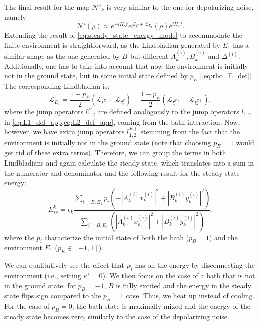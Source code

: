 The final result for the map $\mathcal{N}'_k$ is very similar to the one for depolarizing noise, namely
\begin{equation}
    \mathcal{N}'(\rho)\approx e^{-iH_{S}t}e^{\mathcal{L}_C+\mathcal{L}_{E_1}}(\rho) e^{i H_{S}t}.
\end{equation}
Extending the result of \cref{eq:steady_state_energy_mode} to accommodate the finite environment is straightforward, as the Lindbladian generated by $E_1$ has a similar shape as the one generated by $B$ but different $A_k^{(i)},B_k^{(i)}$ and $\Delta^{(i)}$. Additionally, one has to take into account that now the environment is initially not in the ground state, but in some initial state defined by $p_E$ [\cref{eq:rho_E_def}].
The corresponding Lindbladian is:
\begin{equation}
    \mathcal{L}_{E_1}=\frac{1+p_E}{2}(\mathcal{L}_{l_1^E}+\mathcal{L}_{l_2^E})+\frac{1-p_E}{2}(\mathcal{L}_{l_1^{E\dag}}+\mathcal{L}_{l_2^{E\dag}}),
\end{equation}
where the jump operators $l_{1,2}^E$ are defined analogously to the jump operators $l_{1,2}$ in \cref{eq:L1_def_app,eq:L2_def_app}, coming from the bath interaction. Now, however, we have extra jump operators $l_{1,2}^{E\dag}$ stemming from the fact that the environment is initially not in the ground state (note that choosing $p_E=1$ would get rid of these extra terms). Therefore, we can group the terms in both Lindbladians and again calculate the steady state, which translates into a sum in the numerator and denominator and the following result for the steady-state energy:
\begin{equation}
    E_{ss}^k= \epsilon_k\frac{\sum_{i=B,E_1}p_i(-|A^{(i)}_k x_k^{(i)}|^2+|B^{(i)}_k y_k^{(i)}|^2)}{\sum_{i=B,E_1}(|A^{(i)}_k x^{(i)}_k|^2+|B^{(i)}_k y_k^{(i)}|^2)}.\label{eq:steady_state_energy_multibath}
\end{equation}
where the $p_i$ characterize the initial state of both the bath ($p_B=1$) and the environment $E_1$ ($p_E\in[-1,1]$).

We can qualitatively see the effect that $p_i$ has on the energy by disconnecting the environment (i.e., setting $\kappa'=0$). We then focus on the case of a bath that is not in the ground state: for $p_B=-1$, $B$ is fully excited and the energy in the steady state flips sign compared to the $p_B=1$ case. Thus, we heat up instead of cooling. For the case of $p_B=0$, the bath state is maximally mixed and the energy of the steady state becomes zero, similarly to the case of the depolarizing noise.

